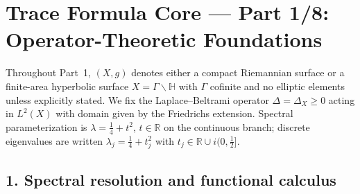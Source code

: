 
\section*{Trace Formula Core — Part 1/8: Operator-Theoretic Foundations}\relax\hspace{0pt}
\label{sec:tfc-part1} %

\noindent
Throughout Part~1, $(X,g)$ denotes either a compact Riemannian surface or a finite-area hyperbolic surface $X=\Gamma\backslash\mathbb{H}$ with $\Gamma$ cofinite and no elliptic elements unless explicitly stated. We fix the Laplace--Beltrami operator $\Delta=\Delta_X\ge0$ acting in $L^2(X)$ with domain given by the Friedrichs extension. Spectral parameterization is $\lambda=\tfrac14+t^2$, $t\in\mathbb{R}$ on the continuous branch; discrete eigenvalues are written $\lambda_j=\tfrac14+t_j^2$ with $t_j\in\mathbb{R}\cup i(0,\tfrac12]$.\relax\hspace{0pt}


\subsection*{1. Spectral resolution and functional calculus}\relax\hspace{0pt}
\label{subsec:tfc1-spectral} %

